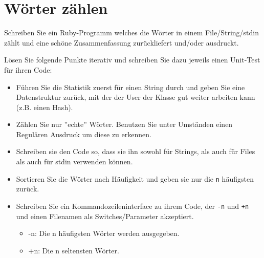 \documentclass[a4paper,11pt,oneside]{scrbook}
\begin{document}

\section{Wörter zählen} %
\label{sec:Wörter zählen}
Schreiben Sie ein Ruby-Programm welches die Wörter in einem File/String/stdin zählt und eine schöne Zusammenfassung zurückliefert und/oder ausdruckt.

Lösen Sie folgende Punkte iterativ und schreiben Sie dazu jeweils einen Unit-Test für ihren Code:

\begin{itemize}
  \item Führen Sie die Statistik zuerst für einen String durch und geben Sie eine Datenstruktur zurück, mit der der User der Klasse gut weiter arbeiten kann (z.B. einen Hash).
  \item Zählen Sie nur ''echte'' Wörter. Benutzen Sie unter Umständen einen Regulären Ausdruck um diese zu erkennen.
  \item Schreiben sie den Code so, dass sie ihn sowohl für Strings, als auch für Files als auch für stdin verwenden können.
  \item Sortieren Sie die Wörter nach Häufigkeit und geben sie nur die \texttt{n} häufigsten zurück.
  \item Schreiben Sie ein Kommandozeileninterface zu ihrem Code, der \texttt{-n} und \texttt{+n} und einen Filenamen als Switches/Parameter akzeptiert.
  \begin{itemize}
    \item -n: Die n häufigsten Wörter werden ausgegeben.
    \item +n: Die n seltensten Wörter.
  \end{itemize}
  
\end{itemize}












\end{document}

